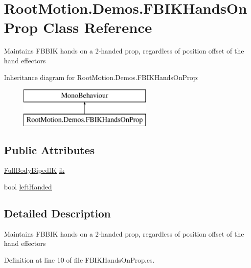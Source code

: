 \hypertarget{class_root_motion_1_1_demos_1_1_f_b_i_k_hands_on_prop}{}\section{Root\+Motion.\+Demos.\+F\+B\+I\+K\+Hands\+On\+Prop Class Reference}
\label{class_root_motion_1_1_demos_1_1_f_b_i_k_hands_on_prop}


Maintains F\+B\+B\+IK hands on a 2-\/handed prop, regardless of position offset of the hand effectors  


Inheritance diagram for Root\+Motion.\+Demos.\+F\+B\+I\+K\+Hands\+On\+Prop\+:\begin{figure}[H]
\begin{center}
\leavevmode
\includegraphics[height=2.000000cm]{class_root_motion_1_1_demos_1_1_f_b_i_k_hands_on_prop}
\end{center}
\end{figure}
\subsection*{Public Attributes}
\begin{DoxyCompactItemize}
\item 
\mbox{\hyperlink{class_root_motion_1_1_final_i_k_1_1_full_body_biped_i_k}{Full\+Body\+Biped\+IK}} \mbox{\hyperlink{class_root_motion_1_1_demos_1_1_f_b_i_k_hands_on_prop_a33ee4c43d3c774795a3f67d5c19a46d4}{ik}}
\item 
bool \mbox{\hyperlink{class_root_motion_1_1_demos_1_1_f_b_i_k_hands_on_prop_a89595590761816601d7bdadec5148d9b}{left\+Handed}}
\end{DoxyCompactItemize}


\subsection{Detailed Description}
Maintains F\+B\+B\+IK hands on a 2-\/handed prop, regardless of position offset of the hand effectors 



Definition at line 10 of file F\+B\+I\+K\+Hands\+On\+Prop.\+cs.



